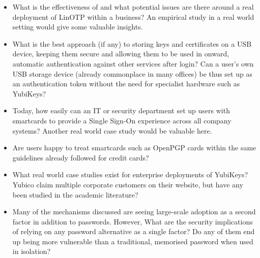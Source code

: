 \documentclass{report}
\begin{document}
\begin{itemize}
\item What is the effectiveness of and what potential issues are there around
  a real deployment of LinOTP within a business? An empirical study in a
  real world setting would give some valuable insights.
\item What is the best approach (if any) to storing keys and certificates on
  a USB device, keeping them secure and allowing them to be used in onward,
  automatic authentication against other services after login? Can a user's
  own USB storage device (already commonplace in many offices) be thus set
  up as an authentication token without the need for specialist hardware
  such as YubiKeys?
\item Today, how easily can an IT or security department set up users with
  smartcards to provide a Single Sign-On experience across all company
  systems? Another real world case study would be valuable here.
\item Are users happy to treat smartcards such as OpenPGP cards within the
  same guidelines already followed for credit cards?
\item What real world case studies exist for enterprise deployments of YubiKeys?
  Yubico claim multiple corporate customers on their website, but have any
  been studied in the academic literature?
\item Many of the mechanisms discussed are seeing large-scale
  adoption as a second factor in addition to passwords. However, What are the
  security implications of relying on any password alternative as a single factor?
  Do any of them end up being more vulnerable than a traditional, memorised
  password when used in isolation?
\end{itemize}

\printbibliography
\end{document}
